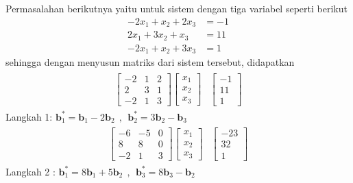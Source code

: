 \documentclass{article}   %
\begin{document}
	
	Permasalahan berikutnya yaitu untuk sistem dengan tiga variabel seperti berikut
	\begin{align*}
		-2x_1 + x_2  + 2x_3 &= -1 \\
		2x_1 + 3x_2  + x_3 &= 11  \\
		-2x_1 + x_2  + 3x_3 &= 1 
	\end{align*}
sehingga dengan menyusun matriks dari sistem tersebut, didapatkan
	\begin{align*}
		\begin{array}{r|r} 
			\left[
			\begin{array}{rrr} 
				-2 & 1 & 2\\
				2 & 3 & 1\\
				-2 &1 & 3 
			\end{array} 
			\right] 
			\left[
			\begin{array}{r} 
				x_1 \\ 
				x_2 \\
				x_3
			\end{array}
			\right] 
			 & \left[
			\begin{array}{r} 
				-1\\
				11\\
				1 
			\end{array} 
			\right]
		\end{array}
	\end{align*}
	Langkah 1: $\textbf{b}^*_1= \textbf{b}_1 - 2\textbf{b}_2~~,~~\textbf{b}^*_2= 3\textbf{b}_2 - \textbf{b}_3$ \\
	\begin{align*}
		\begin{array}{r|r} 
			\left[
			\begin{array}{rrr} 
				-6 & -5 & 0\\
				8 & 8 & 0\\
				-2 &1 & 3 
			\end{array} 
			\right] 
			\left[
			\begin{array}{r} 
				x_1 \\ 
				x_2 \\
				x_3
			\end{array}
			\right]
			 & \left[
			 \begin{array}{r} 
			 	-23\\
			 	32\\
			 	1 
			 \end{array} 
			 \right]
		\end{array}
	\end{align*}
	Langkah 2 : $\textbf{b}^*_1= 8\textbf{b}_1 + 5\textbf{b}_2~~,~~\textbf{b}^*_3= 8\textbf{b}_3 - \textbf{b}_2$ \\
\end{document}
